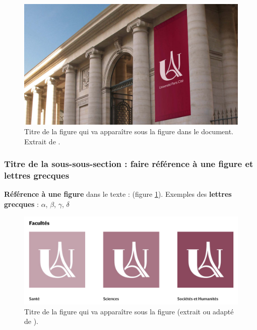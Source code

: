 \begin{figure}[ht]
\centering
\includegraphics[scale=0.2]{figures/chap1/SiegeUP_1920-1.jpg} %
\caption[Titre de la figure qui va apparaître dans la table]{Titre de la figure qui va apparaître sous la figure dans le document. Extrait de \cite{Smith2021-wv}.}
\label{fig:siegeUP}
\end{figure}



\subsubsection{Titre de la sous-sous-section : faire référence à une figure et lettres grecques}

\textbf{Référence à une figure} dans le texte : (figure \ref{fig:siegeUP}). 
Exemples des \textbf{lettres grecques} : $\alpha$, $\beta$, $\gamma$, $\delta$


\begin{figure}[ht]
\centering
\includegraphics[scale=0.35]{figures/chap1/faculte-upc.png} %
\caption[Titre de la figure qui va apparaître dans la table]{Titre de la figure qui va apparaître sous la figure (extrait ou adapté de \cite{Faulkes2021}).}
\label{fig:faculteUPC}
\end{figure}


